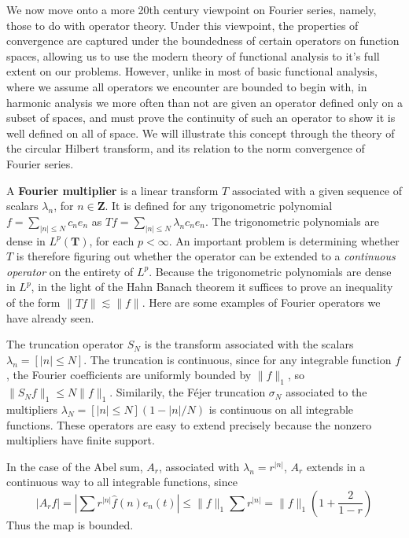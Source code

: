 We now move onto a more 20th century viewpoint on Fourier series, namely, those to do with operator theory. Under this viewpoint, the properties of convergence are captured under the boundedness of certain operators on function spaces, allowing us to use the modern theory of functional analysis to it's full extent on our problems. However, unlike in most of basic functional analysis, where we assume all operators we encounter are bounded to begin with, in harmonic analysis we more often than not are given an operator defined only on a subset of spaces, and must prove the continuity of such an operator to show it is well defined on all of space. We will illustrate this concept through the theory of the circular Hilbert transform, and its relation to the norm convergence of Fourier series.

A {\bf Fourier multiplier} is a linear transform $T$ associated with a given sequence of scalars $\lambda_n$, for $n \in \mathbf{Z}$. It is defined for any trigonometric polynomial $f = \sum_{|n| \leq N} c_n e_n$ as $Tf = \sum_{|n| \leq N} \lambda_n c_n e_n$. The trigonometric polynomials are dense in $L^p(\mathbf{T})$, for each $p < \infty$. An important problem is determining whether $T$ is therefore figuring out whether the operator can be extended to a {\it continuous operator} on the entirety of $L^p$. Because the trigonometric polynomials are dense in $L^p$, in the light of the Hahn Banach theorem it suffices to prove an inequality of the form $\| Tf \| \lesssim \| f \|$. Here are some examples of Fourier operators we have already seen.

\begin{example}
    The truncation operator $S_N$ is the transform associated with the scalars $\lambda_n = [|n| \leq N]$. The truncation is continuous, since for any integrable function $f$, the Fourier coefficients are uniformly bounded by $\| f \|_1$, so $\| S_N f \|_1 \leq N \| f \|_1$. Similarily, the F\'{e}jer truncation $\sigma_N$ associated to the multipliers $\lambda_N = [|n| \leq N](1 - |n|/N)$ is continuous on all integrable functions. These operators are easy to extend precisely because the nonzero multipliers have finite support.
\end{example}

\begin{example}
    In the case of the Abel sum, $A_r$, associated with $\lambda_n = r^{|n|}$, $A_r$ extends in a continuous way to all integrable functions, since
    \[ |A_r f| = \left| \sum r^{|n|} \widehat{f}(n) e_n(t) \right| \leq \| f \|_1 \sum r^{|n|} = \| f \|_1 \left( 1 + \frac{2}{1 - r} \right) \]
    Thus the map is bounded.
\end{example}

